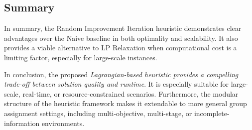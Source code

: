 \subsection{Summary}

In summary, the Random Improvement Iteration heuristic demonstrates clear advantages over the Naive baseline in both optimality and scalability. It also provides a viable alternative to LP Relaxation when computational cost is a limiting factor, especially for large-scale instances.

In conclusion, the proposed \emph{Lagrangian-based heuristic provides a compelling trade-off between solution quality and runtime}. It is especially suitable for large-scale, real-time, or resource-constrained scenarios. Furthermore, the modular structure of the heuristic framework makes it extendable to more general group assignment settings, including multi-objective, multi-stage, or incomplete-information environments.
